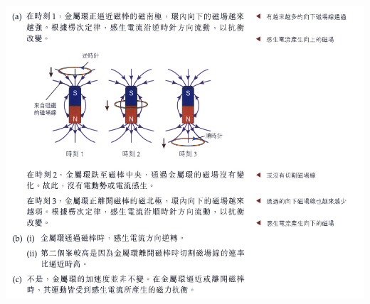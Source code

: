 {
    \clearpage
}{
    \par{\par\centering\includegraphics[width=\textwidth]{./img/ch5_induction_lq_2024-06-24-16-15-31.png}\par}
}


